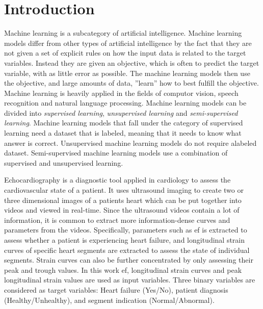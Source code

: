 \chapter{Introduction} \label{chap:intro}

Machine learning is a subcategory of artificial intelligence. Machine learning models differ from other types of artificial intelligence by the fact that they are not given a set of explicit rules on how the input data is related to the target variables. Instead they are given an objective, which is often to predict the target variable, with as little error as possible. The machine learning models then use the objective, and large amounts of data, ''learn'' how to best fulfill the objective. Machine learning is heavily applied in the fields of computor vision, speech recognition and natural language processing. Machine learning models can be divided into \textit{supervised learning}, \textit{unsupervised learning} and \textit{semi-supervised learning}. Machine learning models that fall under the category of supervised learning need a dataset that is labeled, meaning that it needs to know what answer is correct. Unsupervised machine learning models do not require alabeled dataset. Semi-supervised machine learning models use a combination of supervised and unsupervised learning. \bigskip

Echocardiography is a diagnostic tool applied in cardiology to assess the cardiovascular state of a patient. It uses ultrasound imaging to create two or three dimensional images of a patients heart which can be put together into videos and viewed in real-time. Since the ultrasound videos contain a lot of information, it is common to extract more information-dense curves and parameters from the videos. Specifically, parameters such as \acrfull{ef} is extracted to assess whether a patient is experiencing heart failure, and longitudinal strain curves of specific heart segments are extracted to assess the state of individual segments. Strain curves can also be further concentrated by only assessing their peak and trough values. In this work \acrshort{ef}, longitudinal strain curves and peak longitudinal strain values are used as input variables. Three binary variables are considered as target variables: Heart failure (Yes/No), patient diagnosis (Healthy/Unhealthy), and segment indication (Normal/Abnormal).

